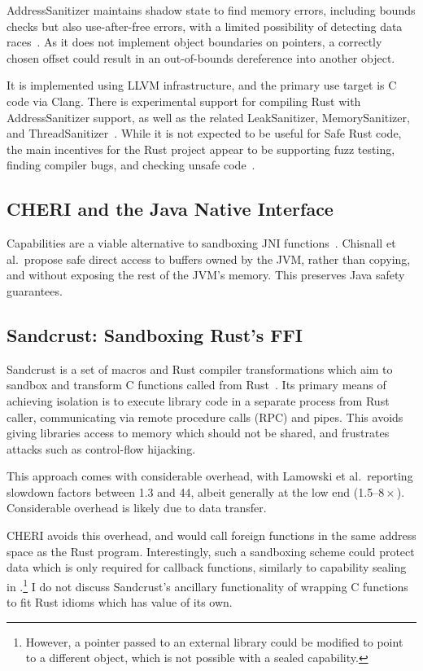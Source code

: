 \documentclass[dissertation.tex]{subfiles}
\begin{document}
AddressSanitizer maintains shadow state to find memory errors, including
bounds checks but also use-after-free errors, with a limited possibility
of detecting data races~\cite{serebryany-asan}.
As it does not implement object boundaries on pointers, a correctly
chosen offset could result in an out-of-bounds dereference into another
object.

It is implemented using LLVM infrastructure, and the primary use target
is C code via Clang.
There is experimental support for compiling Rust with AddressSanitizer
support, as well as the related LeakSanitizer, MemorySanitizer, and
ThreadSanitizer~\cite{rust-san}.
While it is not expected to be useful for Safe Rust code, the main
incentives for the Rust project appear to be supporting fuzz testing,
finding compiler bugs, and checking unsafe code~\cite{rust-asan-track}.


\subsection{CHERI and the Java Native Interface}
\label{sec:bg-cheri-jni}

Capabilities are a viable alternative to sandboxing JNI
functions~\cite{cheri-jni}.
Chisnall et al.\ propose safe direct access to buffers owned by the JVM,
rather than copying, and without exposing the rest of the JVM's memory.
This preserves Java safety guarantees.


\subsection{Sandcrust: Sandboxing Rust's FFI}
\label{sec:rel-sandcrust}

Sandcrust is a set of macros and Rust compiler transformations which aim
to sandbox and transform C functions called from
Rust~\cite{lamowski-sandcrust}.
Its primary means of achieving isolation is to execute library code in a
separate process from Rust caller, communicating via remote procedure
calls (RPC) and pipes.
This avoids giving libraries access to memory which should not be
shared, and frustrates attacks such as control-flow hijacking.

This approach comes with considerable overhead, with Lamowski et al.\
reporting slowdown factors between 1.3 and 44, albeit generally at the
low end (1.5--\(8\times\)).
Considerable overhead is likely due to data transfer.

CHERI avoids this overhead, and would call foreign functions in the same
address space as the Rust program.
Interestingly, such a sandboxing scheme could protect data which is only
required for callback functions, similarly to capability sealing in
\Cref{sec:eval-rust-xprocess}.\footnote{
    However, a pointer passed to an external library could be modified
    to point to a different object, which is not possible with a sealed
    capability.
}
I do not discuss Sandcrust's ancillary functionality of wrapping C
functions to fit Rust idioms which has value of its own.
\end{document}
